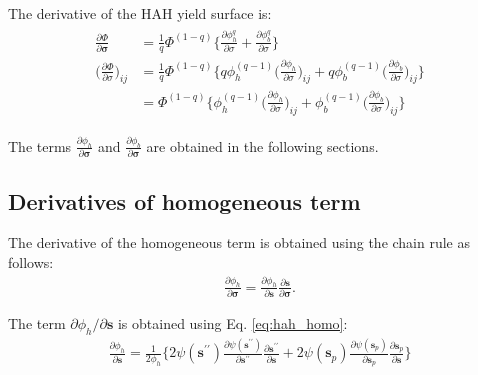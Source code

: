 \documentclass[12pt]{amsart}
\begin{document}
The derivative of the HAH yield surface is:
\begin{eqnarray}
  \begin{split}
  \label{eq:hah_deriv}
  \frac{\partial\Phi}{\partial\mathbf{\sigma}} &=\frac{1}{q}\Phi^{(1-q)} \bigg\{                  \frac{\partial{\phi_h^q}}{\partial{\sigma}}  +                 \frac{\partial{\phi_b^q}}{\partial{\sigma}}         \bigg\}\\
  \bigg(\frac{\partial\Phi}{\partial\sigma}\bigg)_{ij}&=\frac{1}{q}\Phi^{(1-q)} \bigg\{  q \phi_h^{(q-1)}\Big(\frac{\partial{\phi_h}  }{\partial{\sigma}}\Big)_{ij}  + q \phi_b^{(q-1)} \Big(\frac{\partial{\phi_b}  }{ \partial\sigma}\Big)_{ij}         \bigg\}\\
                                                      &=\Phi^{(1-q)} \bigg\{    \phi_h^{(q-1)}\Big(\frac{\partial{\phi_h}  }{\partial{\sigma}}\Big)_{ij}  + \phi_b^{(q-1)} \Big(\frac{\partial{\phi_b}  }{ \partial\sigma}\Big)_{ij}         \bigg\}
  \end{split}
\end{eqnarray}

The terms $\frac{\partial{\phi_h}  }{\partial{\mathbf{\sigma}}}$ and $\frac{\partial{\phi_b}  }{\partial{\mathbf{\sigma}}}$ are obtained in the following sections.


\subsection{Derivatives of homogeneous term}
\label{sec:2.1}


The derivative of the homogeneous term is obtained using the chain rule as follows:
\begin{eqnarray}
  \label{eq:derv1}
  \frac{\partial{\phi_h}  }{\partial{\mathbf{\sigma}}}  =   \frac{\partial{\phi_h}}{\partial{\mathbf{s}}} \frac{\partial{\mathbf{s}}}{\partial{\mathbf{\sigma}}}.
\end{eqnarray}

The term $\partial\phi_h/\partial \mathbf{s} $ is obtained using Eq. \ref{eq:hah_homo}:
\begin{eqnarray}
  \label{eq:derv2}
  \frac{\partial{\phi_h}  }{\partial{\mathbf{s}}} = \frac{1}{2\phi_h}\bigg\{ 2\psi(\mathbf{s}^{\prime\prime})\frac{\partial{\psi(\mathbf{s}^{\prime\prime})}}{\partial{\mathbf{s}^{\prime\prime}}}  \frac{\partial\mathbf{s}^{\prime\prime}}{\partial \mathbf{s}}  +  2\psi(\mathbf{s}_p) \frac{\partial{\psi(\mathbf{s}_p)}}{\partial{\mathbf{s}_p}} \frac{\partial{\mathbf{s}_p}}{\partial{\mathbf{s}}}\bigg\}
\end{eqnarray}
\end{document}
